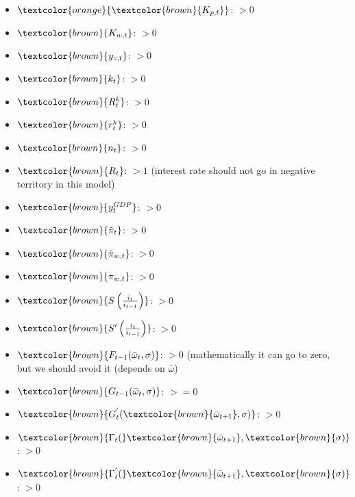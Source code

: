 \begin{itemize}
    \item $ \textcolor{orange}{\textcolor{brown}{K_{p,t}}} $: $>0$
    \item $ \textcolor{brown}{K_{w,t}} $: $>0$
    \item $  \textcolor{brown}{y_{z,t}} $: $>0$
    \item $  \textcolor{brown}{k_t} $: $>0$
    \item $ \textcolor{brown}{R_t^k} $: $>0$
    \item $  \textcolor{brown}{r_{t}^k} $: $>0$
    \item $ \textcolor{brown}{n_{t}}  $: $>0$
    \item $ \textcolor{brown}{R_t} $: $>1$ (interest rate should not go in negative territory in this model)
    \item $ \textcolor{brown}{y_{t}^{GDP}} $: $>0$
    \item $ \textcolor{brown}{\tilde{\pi}_t} $: $>0$
    \item $ \textcolor{brown}{\tilde{\pi}_{w,t}} $:  $>0$
    \item $ \textcolor{brown}{\pi_{w,t}} $: $>0$ 
    \item $ \textcolor{brown}{S\left(\frac{i_t}{i_{t-1}} \right)}$: $>0$
    \item $ \textcolor{brown}{S'\left(  \frac{ i_t}{i_{t-1}}\right)}$: $>0$
    \item $ \textcolor{brown}{F_{t-1}(\bar{\omega}_t, \sigma)} $: $>0$ (mathematically it can go to zero, but we should avoid it (depends on $\bar{\omega}$) 
    \item $ \textcolor{brown}{G_{t-1}(\bar{\omega}_t, \sigma)}$: $>=0$
    \item $ \textcolor{brown}{G_{t}^{'}(\textcolor{brown}{\bar{\omega}_{t+1}}, \sigma) }$: $>0$
    \item $ \textcolor{brown}{\Gamma_t(}\textcolor{brown}{\bar{\omega}_{t+1}},\textcolor{brown}{\sigma)}$: $>0$
    \item $ \textcolor{brown}{\Gamma_t^{'}(}\textcolor{brown}{\bar{\omega}_{t+1}},\textcolor{brown}{\sigma)}$: $>0$
\end{itemize}

\newpage



